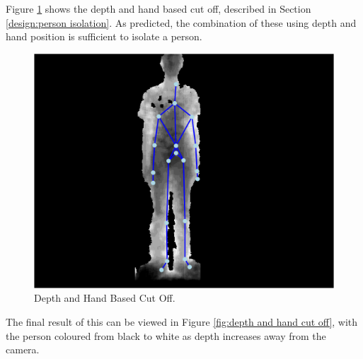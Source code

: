 Figure \ref{fig:depth and hand based cut off} shows the depth and hand based cut off, described in Section \ref{design:person isolation}. As predicted, the combination of these using depth and hand position is sufficient to isolate a person.\\

\begin{figure}[h]
\begin{center}
\includegraphics[scale=0.4]{./design/parse3} 
\end{center}
\caption{Depth and Hand Based Cut Off.}
\label{fig:depth and hand based cut off}
\end{figure} 

The final result of this can be viewed in Figure \ref{fig:depth and hand cut off}, with the person coloured from black to white as depth increases away from the camera.